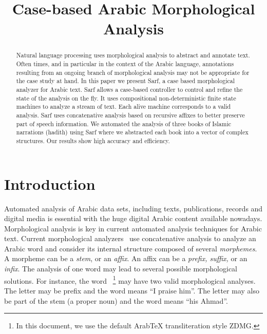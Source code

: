 \documentclass[11pt,letterpaper]{article}
\title{Case-based Arabic Morphological Analysis }
\date{}
\begin{document}
\maketitle

\begin{abstract}
Natural language processing uses morphological 
analysis to abstract and annotate text.
Often times, and in particular in the context
of the Arabic language, annotations resulting from 
an ongoing branch of morphological analysis may not be
appropriate for the case study at hand. 
In this paper we present Sarf, a case based morphological 
analyzer for Arabic text. 
Sarf allows a case-based controller to control and refine
the state of the analysis on the fly. 
It uses compositional non-deterministic finite state machines 
to analyze a stream of text. 
Each alive machine corresponds to a valid analysis. 
Sarf uses concatenative analysis based on recursive affixes 
to better preserve part of speech information.
We automated the analysis of three books of Islamic
narrations (hadith) using Sarf where we
abstracted each book into a vector of complex structures.
Our results show high accuracy and efficiency.
\end{abstract}

\section{Introduction}

Automated analysis of Arabic data sets, including texts, 
publications, records and digital media is essential
with the huge digital Arabic content available nowadays. 
Morphological analysis is key in current automated 
analysis techniques for Arabic text. 
Current morphological analyzers~\cite{Sughaiyer:04}
use concatenative analysis
to analyze an Arabic word and
consider its internal structure composed of several
{\em morphemes}. A morpheme can be a {\em stem}, or an {\em affix}.
An affix can be a {\em prefix, suffix, } or an {\em infix}.
The analysis of one word may lead to several possible
morphological solutions.
\vocalize
For instance, the word ~\footnote{In this document, we use the default ArabTeX transliteration style ZDMG.}
may have two valid morphological analyses. 
The letter  may be prefix and the word means ``I praise him''.
The letter  may also be part of the stem 
 (a proper noun)
and the word means ``his Ahmad''.
\end{document}
